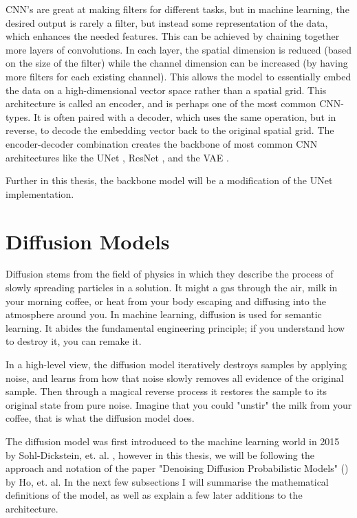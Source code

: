 CNN's are great at making filters for different tasks, but in machine learning, the desired output is rarely a filter, but instead some representation of the data, which enhances the needed features. This can be achieved by chaining together more layers of convolutions. In each layer, the spatial dimension is reduced (based on the size of the filter) while the channel dimension can be increased (by having more filters for each existing channel). This allows the model to essentially embed the data on a high-dimensional vector space rather than a spatial grid. This architecture is called an encoder, and is perhaps one of the most common CNN-types. It is often paired with a decoder, which uses the same operation, but in reverse, to decode the embedding vector back to the original spatial grid. The encoder-decoder combination creates the backbone of most common CNN architectures like the UNet \cite{unet}, ResNet \cite{resnet}, and the VAE \cite{vae}. 

Further in this thesis, the backbone model will be a modification of the UNet implementation.

\section{Diffusion Models}

Diffusion stems from the field of physics in which they describe the process of slowly spreading particles in a solution. It might a gas through the air, milk in your morning coffee, or heat from your body escaping and diffusing into the atmosphere around you. In machine learning, diffusion is used for semantic learning. It abides the fundamental engineering principle; if you understand how to destroy it, you can remake it.

In a high-level view, the diffusion model iteratively destroys samples by applying noise, and learns from how that noise slowly removes all evidence of the original sample. Then through a magical reverse process it restores the sample to its original state from pure noise. Imagine that you could "unstir" the milk from your coffee, that is what the diffusion model does.

The diffusion model was first introduced to the machine learning world in 2015 by Sohl-Dickstein, et. al. \cite{org-diffusion}, however in this thesis, we will be following the approach and notation of the paper "Denoising Diffusion Probabilistic Models" (\cite{ddpm}) by Ho, et. al. In the next few subsections I will summarise the mathematical definitions of the model, as well as explain a few later additions to the architecture.

